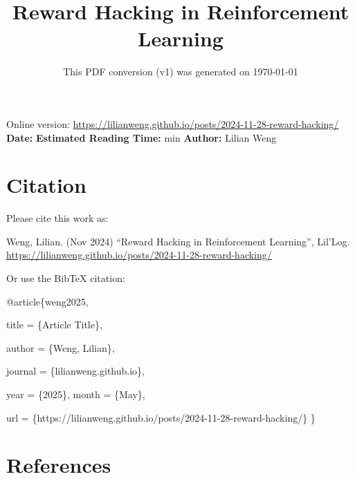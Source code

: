 \documentclass[12pt]{article}
\title{Reward Hacking in Reinforcement Learning}
\date{This PDF conversion (v1) was generated on \today\footnotemark}
\begin{document}
\maketitle
\begin{center}
    Online version: \url{https://lilianweng.github.io/posts/2024-11-28-reward-hacking/} \\
    \textbf{Date:} \quad
    \textbf{Estimated Reading Time:}  min \quad
    \textbf{Author:} Lilian Weng
\end{center}




\newpage
\tableofcontents
\newpage
\vspace{1em}
\n\n\n\section{Citation}
Please cite this work as:

\begin{tcolorbox}[colback=black!5!white, colframe=black!80!white, boxrule=0.5pt, arc=2mm, left=1mm, right=1mm, top=1mm, bottom=1mm]
  Weng, Lilian. (Nov 2024) ``Reward Hacking in Reinforcement Learning'', Lil'Log. \url{https://lilianweng.github.io/posts/2024-11-28-reward-hacking/}
  \end{tcolorbox}

Or use the BibTeX citation:

\begin{tcolorbox}[
    colback=black!5!white,
    colframe=black!80!white,
    boxrule=0.5pt,
    arc=2mm,
    left=1mm,
    right=1mm,
    top=1mm,
    bottom=1mm,
    listing only,
    listing options={
      basicstyle=\ttfamily\footnotesize,
      breaklines=true,
      literate={\{}{{\char`\{}}1 {\}}{{\char`\}}}1
    }
  ]
  @article\{weng2025,

    title   = \{Article Title\},

    author  = \{Weng, Lilian\},

    journal = \{lilianweng.github.io\},

    year    = \{2025\},
    month   = \{May\},

    url     = \{https://lilianweng.github.io/posts/2024-11-28-reward-hacking/\}\n
  \}
  \end{tcolorbox}

\newpage
\section{References}

\n
\end{document}
